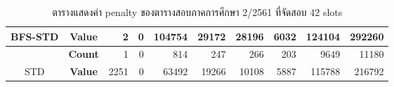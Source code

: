 \begin{table}[]
{\begin{tabular}{@{}ccrrrrrrrr@{}}
    \multirow{-2}{*}{BFS-STD}                    & \textbf{Value}                        & 2                           & 0                        & 104754                       & 29172                        & 28196                        & 6032                        & 124104                        & 292260                        \\ \midrule
    {\color[HTML]{FE0000} }                      & {\color[HTML]{FE0000} \textbf{Count}} & {\color[HTML]{FE0000} 1}    & {\color[HTML]{FE0000} 0} & {\color[HTML]{FE0000} 814}   & {\color[HTML]{FE0000} 247}   & {\color[HTML]{FE0000} 266}   & {\color[HTML]{FE0000} 203}  & {\color[HTML]{FE0000} 9649}   & {\color[HTML]{FE0000} 11180}  \\ \cmidrule(l){2-10} 
    \multirow{-2}{*}{{\color[HTML]{FE0000} STD}} & {\color[HTML]{FE0000} \textbf{Value}} & {\color[HTML]{FE0000} 2251} & {\color[HTML]{FE0000} 0} & {\color[HTML]{FE0000} 63492} & {\color[HTML]{FE0000} 19266} & {\color[HTML]{FE0000} 10108} & {\color[HTML]{FE0000} 5887} & {\color[HTML]{FE0000} 115788} & {\color[HTML]{FE0000} 216792} \\ \bottomrule
    \end{tabular}%
    }
    \caption{ตารางแสดงค่า penalty ของตารางสอบภาคการศึกษา 2/2561 ที่จัดสอบ 42 slots}
    \label{tab:result_table_261}
\end{table}
